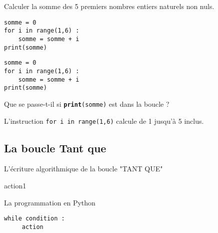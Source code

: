 \begin{minipage}{0.48\linewidth}
\begin{Ex}
Calculer la somme des 5 premiers nombres entiers naturels non nuls.
\begin{lstlisting}
somme = 0
for i in range(1,6) :
	somme = somme + i
print(somme)
\end{lstlisting}
\end{Ex}
\end{minipage}
\hfill
\begin{minipage}{0.48\linewidth}
\begin{Cod}
\begin{lstlisting}
somme = 0
for i in range(1,6) :
	somme = somme + i
print(somme)
\end{lstlisting}
\end{Cod}
Que se passe-t-il si \texttt{\textbf{print}(somme)} est dans la boucle ?
\end{minipage}

\begin{Rq}
L'instruction \texttt{for i in range(1,6)} calcule de 1 jusqu'à 5 inclus. 
\end{Rq}




\subsection*{La boucle Tant que}

\begin{Syn}
\begin{minipage}[t]{0.49\linewidth}
L'écriture algorithmique de la boucle "TANT QUE"
\begin{algobox}
\DebutTantQue
\Ligne action1
\FinTantQue
\end{algobox}
\end{minipage}
\hfill\vrule\hfill
\begin{minipage}[t]{0.49\linewidth}
La programmation en Python
\begin{lstlisting}
while condition :
     action 
\end{lstlisting}
\end{minipage}
\end{Syn}

